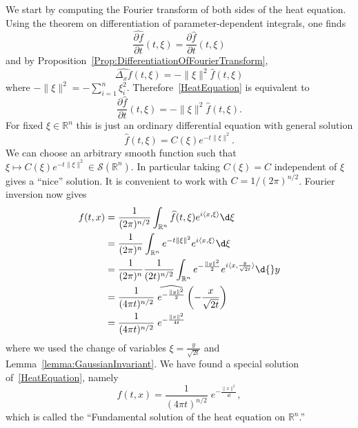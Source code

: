 \documentclass[12pt, oneside, a4paper]{article}
\theoremstyle{dfn}
\newcommand{\scalprod}[2]{\langle #1,#2 \rangle}
\def \S {\ensuremath{\mathcal{S}}}
\def \S {\ensuremath{\mathcal{S}}}
\def\Rbb{\ensuremath{\mathbb{R}}}
\providecommand{\norm}[1]{\lVert#1\rVert}
\begin{document}
We start by computing the Fourier transform of both sides of the heat equation. Using the theorem on differentiation of parameter-dependent integrals, one finds
\begin{equation*}%
	\frac{\widehat{\partial f}}{\partial t} (t,\xi)
	= \frac{\partial \widehat{f}}{\partial t} (t,\xi)
\end{equation*}
and by Proposition~\ref{Prop:DifferentiationOfFourierTransform},
\begin{equation*}%
	\widehat{\Delta_x f}(t,\xi)
	= -\norm{\xi}^2 \widehat{f}(t,\xi)
\end{equation*}
where $-\norm{\xi}^2 = -\sum_{i=1}^n \xi^2_i$. Therefore~\eqref{HeatEquation} is equivalent to
\[
\frac{\partial \widehat{f}}{\partial t} (t,\xi)
= -\norm{\xi}^2 \widehat{f}(t,\xi).
\]
For fixed $\xi \in \Rbb^n$ this is just an ordinary differential equation with general solution
\[
\widehat{f}(t,\xi) = C(\xi) e^{-t\norm{\xi}^2}.
\]
We can choose an arbitrary smooth function such that $\xi \mapsto C(\xi) e^{-t\norm{\xi}^2} \in \S(\Rbb^n)$. In particular taking $C(\xi) = C$ independent of $\xi$ gives a ``nice'' solution. It is convenient to work with $C = 1/(2\pi)^{n/2}$. Fourier inversion now gives
\begin{align*}
	f(t,x)
	&= \frac{1}{(2\pi)^{n/2}} \int_{\Rbb^n} \widehat{f}(t,\xi) e^{i\scalprod{x}{\xi}} \d\xi \\
	&= \frac{1}{(2\pi)^n} \int_{\Rbb^n} e^{-t\norm{\xi}^2} e^{i\scalprod{x}{\xi}} \d\xi \\
	&= \frac{1}{(2\pi)^n} \frac{1}{(2t)^{n/2}} \int_{\Rbb^n} e^{-\frac{\norm{y}^2}{2}} e^{i\scalprod{x}{\frac{y}{\sqrt{2t}}}} \d{}y \\ %
	&= \frac{1}{(4\pi t)^{n/2}} \;\widehat{e^{-\frac{\norm{y}^2}{2}}} \left(-\frac{x}{\sqrt{2t}} \right) \\
	&= \frac{1}{(4\pi t)^{n/2}} \; e^{-\frac{\norm{x}^2}{4t}}
\end{align*}
where we used the change of variables $\xi = \frac{y}{\sqrt{2t}}$ and Lemma~\ref{lemma:GaussianInvariant}. We have found a special solution of~\eqref{HeatEquation}, namely
\begin{equation}\label{FundSolHeatEq}
f(t,x) = \frac{1}{(4\pi t)^{n/2}} \; e^{-\frac{\norm{x}^2}{4t}},
\end{equation}
which is called the ``Fundamental solution of the heat equation on $\Rbb^n$.''
\end{document}
